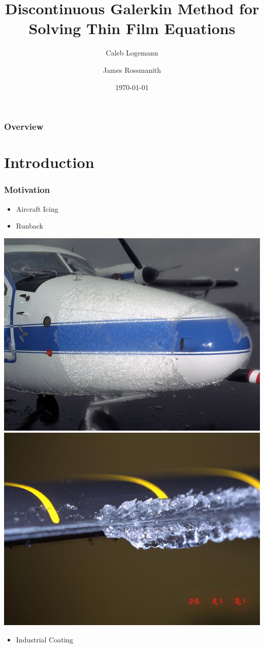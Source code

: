 \documentclass[10pt]{beamer}
\title[]{Discontinuous Galerkin Method for Solving Thin Film Equations} %
\author{Caleb Logemann \and James Rossmanith} %
\institute[Iowa State University]{%
Mathematics Department,\\ Iowa State University \\ %
\medskip
\textit{logemann@iastate.edu}} %
\date{\today} %
\begin{document}
  \begin{frame}
    \titlepage{}
  \end{frame}

  \begin{frame}
    \frametitle{Overview}
    \tableofcontents
  \end{frame}

  \section{Introduction}
    \begin{frame}
      \frametitle{Motivation}
      \begin{itemize}
        \item Aircraft Icing
        \item Runback
      \end{itemize}
      \begin{center}
        \includegraphics[scale=0.2]{Figures/Icing_on_a_plane.jpg}
        \hspace{0.1in}
        \includegraphics[scale=0.2]{Figures/Icing_on_a_rotor.jpg}
      \end{center}
      \begin{itemize}
        \item Industrial Coating
      \end{itemize}
    \end{frame}
\end{document}
